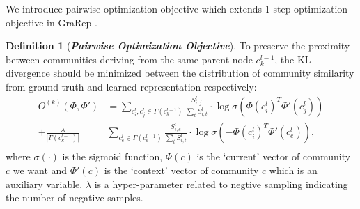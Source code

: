 \documentclass{article}
\theoremstyle{definition}
\newtheorem{defn}{Definition}
\begin{document}
		We introduce pairwise optimization objective which extends 1-step optimization objective in GraRep \cite{Cao2015GraRep}.
		\begin{defn}[\textbf{\emph{Pairwise Optimization Objective}}]
			To preserve the proximity between communities deriving from the same parent node $c_k^{l-1}$, the KL-divergence should be minimized between the distribution of community similarity from ground truth and learned representation respectively: 
			\begin{equation}
			\label{equ:local_loss} 
			\begin{split}
			O^{(k)}(\Phi, \Phi') & = \sum_{c_i^l, c_j^l \in \Gamma(c_k^{l-1})} \frac{S_{i,j}^l}{\sum_t S_{i, t}^l} \cdot \log{\sigma(\Phi(c_i^l)^T \Phi'(c_j^l))} \\
			+ \frac{\lambda}{|\Gamma(c_k^{l-1})|}&\sum_{c_e^l \in \Gamma(c_k^{l-1})} \frac{S_{i, e}^l}{\sum_t S_{i, t}^l} \cdot \log{\sigma(-\Phi(c_i^l)^T \Phi'(c_e^l))}, \\
			\end{split}
			\end{equation}
			where $\sigma(\cdot)$ is the sigmoid function, $\Phi(c)$ is the `current' vector of community $c$ we want and $\Phi'(c)$ is the `context' vector of community $c$ which is an auxiliary variable.
			$\lambda$ is a hyper-parameter related to negtive sampling indicating the number of negative samples.
		\end{defn}
 
\end{document}
